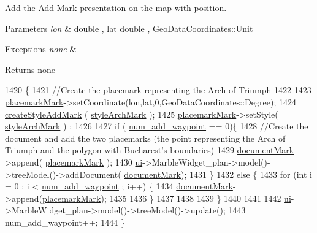 Add the Add Mark presentation on the map with position. 


\begin{DoxyParams}{Parameters}
{\em lon} & double , lat double , Geo\-Data\-Coordinates\-::\-Unit \\
\hline
\end{DoxyParams}

\begin{DoxyExceptions}{Exceptions}
{\em none} & \\
\hline
\end{DoxyExceptions}
\begin{DoxyReturn}{Returns}
none 
\end{DoxyReturn}

\begin{DoxyCode}
1420                                                                        \{
1421     \textcolor{comment}{//Create the placemark representing the Arch of Triumph}
1422 
1423     \hyperlink{a00008_a0e901909eecb8e5845b160761528be11}{placemarkMark}->setCoordinate(lon,lat,0,GeoDataCoordinates::Degree);
1424     \hyperlink{a00008_aa3b30bf8fcdfea266c686e066cb897e1}{createStyleAddMark} (  \hyperlink{a00008_ab3cb2d82e21852d6e82932d21a1b3f41}{styleArchMark} );
1425     \hyperlink{a00008_a0e901909eecb8e5845b160761528be11}{placemarkMark}->setStyle( \hyperlink{a00008_ab3cb2d82e21852d6e82932d21a1b3f41}{styleArchMark} ) ;
1426 
1427   \textcolor{keywordflow}{if} ( \hyperlink{a00008_a0a7415ab9ef5e631521f52e9488a57bb}{num\_add\_waypoint} == 0)\{
1428          \textcolor{comment}{//Create the document and add the two placemarks (the point representing the Arch of Triumph and
       the polygon with Bucharest's boundaries)}
1429              \hyperlink{a00008_a9480c34bf64d45bdea5c4d162eb2bfd4}{documentMark}->append( \hyperlink{a00008_a0e901909eecb8e5845b160761528be11}{placemarkMark} );
1430              \hyperlink{a00008_a6dc041ef6a2ffb329928d2913e8344e6}{ui}->MarbleWidget\_plan->model()->treeModel()->addDocument(
      \hyperlink{a00008_a9480c34bf64d45bdea5c4d162eb2bfd4}{documentMark});
1431       \}
1432  \textcolor{keywordflow}{else} \{
1433       \textcolor{keywordflow}{for} (\textcolor{keywordtype}{int} i = 0 ; i < \hyperlink{a00008_a0a7415ab9ef5e631521f52e9488a57bb}{num\_add\_waypoint} ; i++)   \{
1434           \hyperlink{a00008_a9480c34bf64d45bdea5c4d162eb2bfd4}{documentMark}->append(\hyperlink{a00008_a0e901909eecb8e5845b160761528be11}{placemarkMark});
1435 
1436       \}
1437 
1438 
1439       \}
1440 
1441 
1442   \hyperlink{a00008_a6dc041ef6a2ffb329928d2913e8344e6}{ui}->MarbleWidget\_plan->model()->treeModel()->update();
1443   num\_add\_waypoint++;
1444     \}
\end{DoxyCode}
